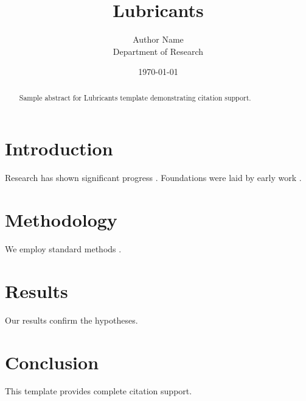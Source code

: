 \documentclass{mdpi}
\title{Lubricants}
\author{Author Name \\ \small Department of Research}
\date{\today}
\begin{document}
\maketitle

\begin{abstract}
Sample abstract for Lubricants template demonstrating citation support.
\end{abstract}

\section{Introduction}
Research has shown significant progress \citep{einstein1905}. Foundations were laid by early work \citep{turing1950}.

\section{Methodology}
We employ standard methods \citep{knuth1984}.

\section{Results}
Our results confirm the hypotheses.

\section{Conclusion}
This template provides complete citation support.



\end{document}
